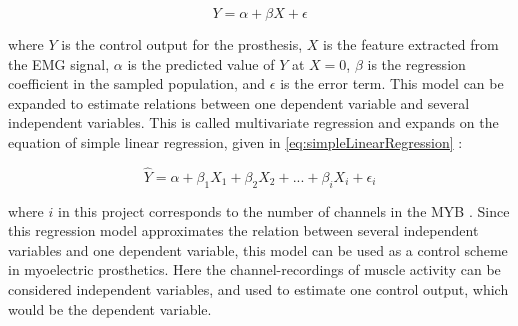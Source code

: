 \begin{equation} \label{eq:simpleLinearRegression}
Y = \alpha + \beta X + \epsilon
\end{equation}

where $Y$ is the control output for the prosthesis, $X$ is the feature extracted from the EMG signal, $\alpha$ is the predicted value of $Y$ at $X = 0$, $\beta$ is the regression coefficient in the sampled population, and $\epsilon$ is the error term.
This model can be expanded to estimate relations between one dependent variable and several independent variables. This is called multivariate regression and expands on the equation of simple linear regression, given in \eqref{eq:simpleLinearRegression} \cite{Zar2009}:

\begin{equation} \label{eq:multiLinearRegression}
\hat{Y} = \alpha + \beta_1 X_{1} + \beta_2 X_{2} + ... + \beta_i X_{i} + \epsilon_i
\end{equation} 

where $i$ in this project corresponds to the number of channels in the MYB \cite{Zar2009}. Since this regression model approximates the relation between several independent variables and one dependent variable, this model can be used as a control scheme in myoelectric prosthetics. Here the channel-recordings of muscle activity can be considered independent variables, and used to estimate one control output, which would be the dependent variable. \cite{Bruun2017}


